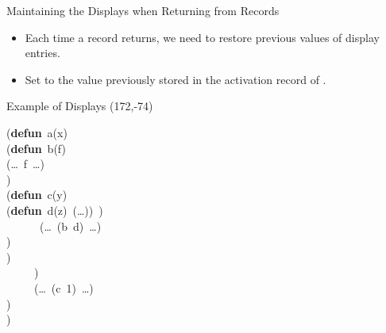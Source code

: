 \begin{bibunit}[apalike]
\begin{frame}{Maintaining the Displays when Returning from Records}
	\begin{itemize}
	\item Each time a record returns, we need to restore previous values of display entries.
	\vfill
	\item Set  to the value previously stored in the activation record of .
	\end{itemize}
\end{frame}

\begin{frame}[fragile]{Example of Displays}
	\putat(172,-74){\parbox{.5\linewidth}{\normalcolor\mdseries
		\begin{tiny}
			{{\def\dash{\raise2.1pt\hbox{\rule{1pt}{0.3pt}}\hspace{1pt}}\begin{tabbing}
			({\textbf{defun}}\ a(x)\\
			\makebox[16pt][l]{}({\textbf{defun}}\ b(f)\\
			\makebox[16pt][l]{}\makebox[16pt][l]{}\makebox[16pt][l]{}(\dots\ f\ \dots)\\
			\makebox[16pt][l]{}\makebox[16pt][l]{})\\
			\makebox[16pt][l]{}\makebox[16pt][l]{}({\textbf{defun}}\ c(y)\\
			\makebox[16pt][l]{}\makebox[16pt][l]{}\makebox[16pt][l]{}({\textbf{defun}}\ d(z)\ (\dots))\ )\\
			\makebox[16pt][l]{}\makebox[16pt][l]{}\makebox[16pt][l]{}\ \ \ \ \ \ (\dots\ (b\ d)\ \dots)\\
			\makebox[16pt][l]{}\makebox[16pt][l]{}\makebox[16pt][l]{})\\
			\makebox[16pt][l]{}\makebox[16pt][l]{})\\
			\makebox[16pt][l]{}\ \ \ \ \ )\\
			\makebox[16pt][l]{}\ \ \ \ \ (\dots\ (c\ 1)\ \dots)\\
			\makebox[16pt][l]{})\\
			)
			\end{tabbing}}}
		\end{tiny}
	}}
	

\end{frame}
\end{bibunit}
